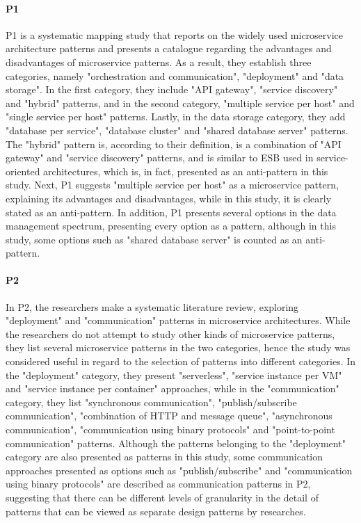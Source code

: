\documentclass{Configuration_Files/PoliMi3i_thesis}
\begin{document}
\paragraph{P1} P1 is a systematic mapping study that reports on the widely used microservice architecture patterns and presents a catalogue regarding the advantages and disadvantages of microservice patterns.
As a result, they establish three categories, namely "orchestration and communication", "deployment" and "data storage".
In the first category, they include "API gateway", "service discovery" and "hybrid" patterns, and in the second category, "multiple service per host" and "single service per host" patterns.
Lastly, in the data storage category, they add "database per service", "database cluster" and "shared database server" patterns.
The "hybrid" pattern is, according to their definition, is a combination of "API gateway" and "service discovery" patterns, and is similar to ESB used in service-oriented architectures, which is, in fact, presented as an anti-pattern in this study.
Next, P1 suggests "multiple service per host" as a microservice pattern, explaining its advantages and disadvantages, while in this study, it is clearly stated as an anti-pattern.
In addition, P1 presents several options in the data management spectrum, presenting every option as a pattern, although in this study, some options such as "shared database server" is counted as an anti-pattern.

\paragraph{P2} In P2, the researchers make a systematic literature review, exploring "deployment" and "communication" patterns in microservice architectures.
While the researchers do not attempt to study other kinds of microservice patterns, they list several microservice patterns in the two categories, hence the study was considered useful in regard to the selection of patterns into different categories.
In the "deployment" category, they present "serverless", "service instance per VM" and "service instance per container" approaches, while in the "communication" category, they list "synchronous communication", "publish/subscribe communication", "combination of HTTP and message queue", "asynchronous communication", "communication using binary protocols" and "point-to-point communication" patterns.
Although the patterns belonging to the "deployment" category are also presented as patterns in this study, some communication approaches presented as options such as "publish/subscribe" and "communication using binary protocols" are described as communication patterns in P2, suggesting that there can be different levels of granularity in the detail of patterns that can be viewed as separate design patterns by researches.
\end{document}

